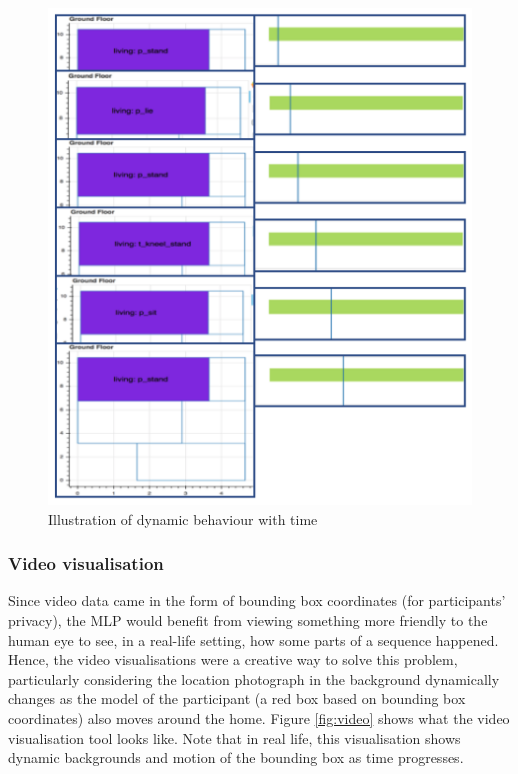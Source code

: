 \documentclass[fleqn,10pt]{SelfArx} %
\begin{document}
\begin{figure}[!h] \centering
	\includegraphics[scale=0.5]{slider} 
	\caption{Illustration of dynamic behaviour with time}
	\label{fig:slider}
\end{figure}

\subsubsection{Video visualisation}
Since video data came in the form of bounding box coordinates (for participants’ privacy), the MLP would benefit from viewing something more friendly to the human eye to see, in a real-life setting, how some parts of a sequence happened. Hence, the video visualisations were a creative way to solve this problem, particularly considering the location photograph in the background dynamically changes as the model of the participant (a red box based on bounding box coordinates) also moves around the home. Figure \ref{fig:video} shows what the video visualisation tool looks like. Note that in real life, this visualisation shows dynamic backgrounds and motion of the bounding box as time progresses. \\
\end{document}
